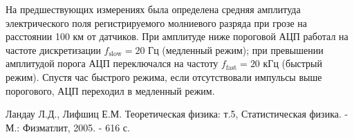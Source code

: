 \documentclass[a4paper,14pt]{extarticle}
\begin{document}
На предшествующих измерениях была определена средняя амплитуда электрического поля регистрируемого молниевого разряда при грозе на расстоянии 100 км от датчиков. При амплитуде ниже пороговой АЦП работал на частоте дискретизации $f_\text{slow}=20$ Гц (медленный режим); при превышении амплитудой порога  АЦП переключался на частоту $f_\text{fast}=20$ кГц (быстрый режим). Спустя час быстрого режима, если отсутствовали импульсы выше порогового, АЦП переходил в медленный режим.


\begin{thebibliography}{99}
 Ландау Л.Д., Лифшиц Е.М. Теоретическая физика: т.5, Статистическая физика. - М.: Физматлит, 2005. - 616 с.
\end{thebibliography}
\end{document}
